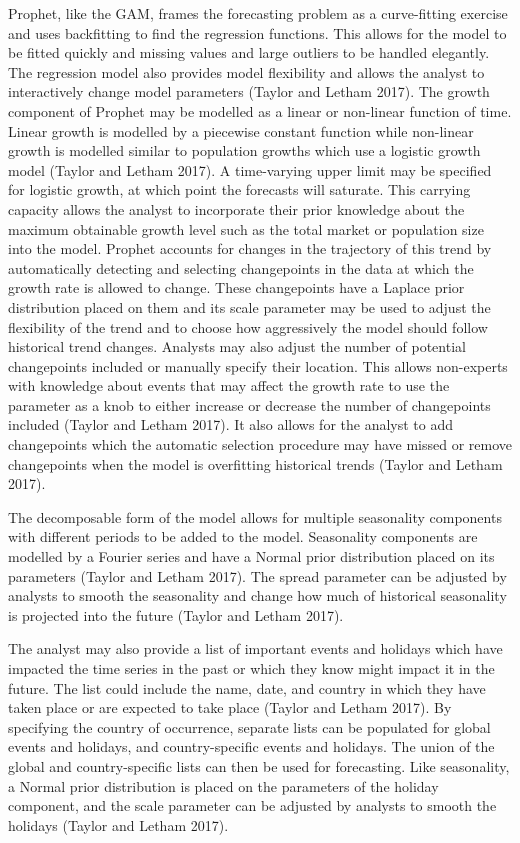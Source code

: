 \documentclass[12pt,a4paper]{article}
\numberwithin{equation}{section}
\numberwithin{figure}{section}
\numberwithin{table}{section}
\begin{document}
Prophet, like the GAM, frames the forecasting problem as a curve-fitting
exercise and uses backfitting to find the regression functions. This
allows for the model to be fitted quickly and missing values and large
outliers to be handled elegantly. The regression model also provides
model flexibility and allows the analyst to interactively change model
parameters (Taylor and Letham 2017). The growth component of Prophet may
be modelled as a linear or non-linear function of time. Linear growth is
modelled by a piecewise constant function while non-linear growth is
modelled similar to population growths which use a logistic growth model
(Taylor and Letham 2017). A time-varying upper limit may be specified
for logistic growth, at which point the forecasts will saturate. This
carrying capacity allows the analyst to incorporate their prior
knowledge about the maximum obtainable growth level such as the total
market or population size into the model. Prophet accounts for changes
in the trajectory of this trend by automatically detecting and selecting
changepoints in the data at which the growth rate is allowed to change.
These changepoints have a Laplace prior distribution placed on them and
its scale parameter may be used to adjust the flexibility of the trend
and to choose how aggressively the model should follow historical trend
changes. Analysts may also adjust the number of potential changepoints
included or manually specify their location. This allows non-experts
with knowledge about events that may affect the growth rate to use the
parameter as a knob to either increase or decrease the number of
changepoints included (Taylor and Letham 2017). It also allows for the
analyst to add changepoints which the automatic selection procedure may
have missed or remove changepoints when the model is overfitting
historical trends (Taylor and Letham 2017).

The decomposable form of the model allows for multiple seasonality
components with different periods to be added to the model. Seasonality
components are modelled by a Fourier series and have a Normal prior
distribution placed on its parameters (Taylor and Letham 2017). The
spread parameter can be adjusted by analysts to smooth the seasonality
and change how much of historical seasonality is projected into the
future (Taylor and Letham 2017).

The analyst may also provide a list of important events and holidays
which have impacted the time series in the past or which they know might
impact it in the future. The list could include the name, date, and
country in which they have taken place or are expected to take place
(Taylor and Letham 2017). By specifying the country of occurrence,
separate lists can be populated for global events and holidays, and
country-specific events and holidays. The union of the global and
country-specific lists can then be used for forecasting. Like
seasonality, a Normal prior distribution is placed on the parameters of
the holiday component, and the scale parameter can be adjusted by
analysts to smooth the holidays (Taylor and Letham 2017).
\end{document}
